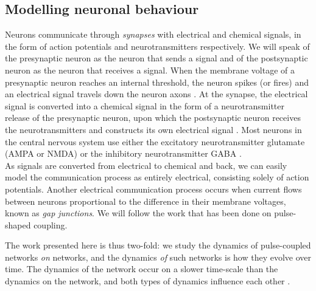\subsection{Modelling neuronal behaviour}
Neurons communicate through \textsl{synapses} with electrical and chemical signals, in the form of action potentials and neurotransmitters respectively. We will speak of the presynaptic neuron as the neuron that sends a signal and of the postsynaptic neuron as the neuron that receives a signal. When the membrane voltage of a presynaptic neuron reaches an internal threshold, the neuron spikes (or fires) and an electrical signal travels down the neuron axons \cite{IntroductionModelingDynamics}. At the synapse, the electrical signal is converted into a chemical signal in the form of a neurotransmitter release of the presynaptic neuron, upon which the postsynaptic neuron receives the neurotransmitters and constructs its own electrical signal \cite{ActionPotentialsAndSynapses}. Most neurons in the central nervous system use either the excitatory neurotransmitter glutamate (AMPA or NMDA) or the inhibitory neurotransmitter GABA \cite{MathFoundationNeuroscience, Zhang2012}. \\

As signals are converted from electrical to chemical and back, we can easily model the communication process as entirely electrical, consisting solely of action potentials. %
Another electrical communication process occurs when current flows between neurons proportional to the difference in their membrane voltages, known as \textsl{gap junctions}. We will follow the work that has been done on pulse-shaped coupling.


The work presented here is thus two-fold:  we study the dynamics of pulse-coupled networks \textsl{on} networks, and the dynamics \textsl{of} such networks is how they evolve over time. The dynamics of the network occur on a slower time-scale than the dynamics on the network, and both types of dynamics influence each other \cite{AdaptiveNetworks2009}. 
